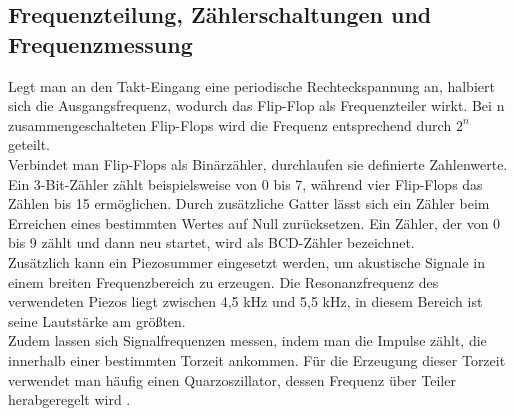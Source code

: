 \subsection*{Frequenzteilung, Zählerschaltungen und Frequenzmessung}
Legt man an den Takt-Eingang eine periodische Rechteckspannung an, halbiert sich die Ausgangsfrequenz, wodurch das Flip-Flop als Frequenzteiler wirkt. Bei n zusammengeschalteten Flip-Flops wird die Frequenz entsprechend durch $2^n$ geteilt.\\
Verbindet man Flip-Flops als Binärzähler, durchlaufen sie definierte Zahlenwerte. Ein 3-Bit-Zähler zählt beispielsweise von 0 bis 7, während vier Flip-Flops das Zählen bis 15 ermöglichen. Durch zusätzliche Gatter lässt sich ein Zähler beim Erreichen eines bestimmten Wertes auf Null zurücksetzen. Ein Zähler, der von 0 bis 9 zählt und dann neu startet, wird als BCD-Zähler bezeichnet.\\
Zusätzlich kann ein Piezosummer eingesetzt werden, um akustische Signale in einem breiten Frequenzbereich zu erzeugen. Die Resonanzfrequenz des verwendeten Piezos liegt zwischen 4,5 kHz und 5,5 kHz, in diesem Bereich ist seine Lautstärke am größten.\\
Zudem lassen sich Signalfrequenzen messen, indem man die Impulse zählt, die innerhalb einer bestimmten Torzeit ankommen. Für die Erzeugung dieser Torzeit verwendet man häufig einen Quarzoszillator, dessen Frequenz über Teiler herabgeregelt wird \cite{v350_anleitung}.\\
